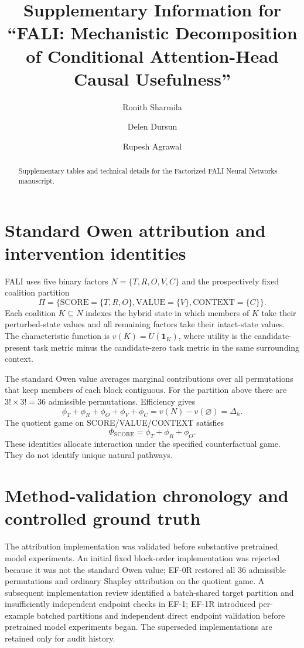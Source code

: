 \documentclass[preprint,12pt,authoryear]{elsarticle}
\begin{document}
\begin{frontmatter}
\title{Supplementary Information for ``FALI: Mechanistic Decomposition of Conditional Attention-Head Causal Usefulness''}
\author[inst1]{Ronith Sharmila}
\author[inst2]{Delen Dursun}
\author[inst3]{Rupesh Agrawal}
\begin{abstract}
Supplementary tables and technical details for the Factorized FALI Neural Networks manuscript.
\end{abstract}
\end{frontmatter}


\section{Standard Owen attribution and intervention identities}

FALI uses five binary factors $N=\{T,R,O,V,C\}$ and the prospectively fixed
coalition partition
\[
\Pi=\{\mathrm{SCORE}=\{T,R,O\},\mathrm{VALUE}=\{V\},\mathrm{CONTEXT}=\{C\}\}.
\]
Each coalition $K\subseteq N$ indexes the hybrid state in which members of $K$
take their perturbed-state values and all remaining factors take their intact-state
values. The characteristic function is $v(K)=U(\mathbf{1}_K)$, where utility is the
candidate-present task metric minus the candidate-zero task metric in the same
surrounding context.

The standard Owen value averages marginal contributions over all permutations
that keep members of each block contiguous. For the partition above there are
$3!\times 3!=36$ admissible permutations. Efficiency gives
\[
\phi_T+\phi_R+\phi_O+\phi_V+\phi_C
=v(N)-v(\varnothing)
=\Delta_h.
\]
The quotient game on SCORE/VALUE/CONTEXT satisfies
\[
\Phi_{\mathrm{SCORE}}=\phi_T+\phi_R+\phi_O.
\]
These identities allocate interaction under the specified counterfactual game.
They do not identify unique natural pathways.

\section{Method-validation chronology and controlled ground truth}

The attribution implementation was validated before substantive pretrained
model experiments. An initial fixed block-order implementation was rejected
because it was not the standard Owen value; EF-0R restored all 36 admissible
permutations and ordinary Shapley attribution on the quotient game. A subsequent
implementation review identified a batch-shared target partition and
insufficiently independent endpoint checks in EF-1; EF-1R introduced
per-example batched partitions and independent direct endpoint validation before
pretrained model experiments began. The superseded implementations are retained
only for audit history.
\end{document}
